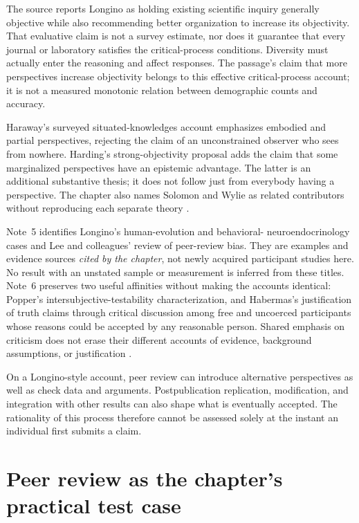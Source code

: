 The source reports Longino as holding existing scientific inquiry
generally objective while also recommending better organization to
increase its objectivity. That evaluative claim is not a survey
estimate, nor does it guarantee that every journal or laboratory
satisfies the critical-process conditions. Diversity must actually
enter the reasoning and affect responses. The passage's claim that
more perspectives increase objectivity belongs to this effective
critical-process account; it is not a measured monotonic relation
between demographic counts and accuracy.

Haraway's surveyed situated-knowledges account emphasizes embodied
and partial perspectives, rejecting the claim of an unconstrained
observer who sees from nowhere. Harding's strong-objectivity proposal
adds the claim that some marginalized perspectives have an epistemic
advantage. The latter is an additional substantive thesis; it does
not follow just from everybody having a perspective. The chapter
also names Solomon and Wylie as related contributors without
reproducing each separate theory
\parencite[p.~751]{AndersenAndersen2021Scientific}.

Note~5 identifies Longino's human-evolution and behavioral-
neuroendocrinology cases and Lee and colleagues' review of peer-review
bias. They are examples and evidence sources \emph{cited by the
chapter}, not newly acquired participant studies here. No result
with an unstated sample or measurement is inferred from these titles.
Note~6 preserves two useful affinities without making the accounts
identical: Popper's intersubjective-testability characterization, and
Habermas's justification of truth claims through critical discussion
among free and uncoerced participants whose reasons could be accepted
by any reasonable person. Shared emphasis on criticism does not erase
their different accounts of evidence, background assumptions, or
justification \parencite[p.~753, nn.~5--6]{AndersenAndersen2021Scientific}.

On a Longino-style account, peer review can introduce alternative
perspectives as well as check data and arguments. Postpublication
replication, modification, and integration with other results can also
shape what is eventually accepted. The rationality of this process
therefore cannot be assessed solely at the instant an individual first
submits a claim.

\section{Peer review as the chapter's practical test case}
\label{sec:p11-rat141-peer-review}

